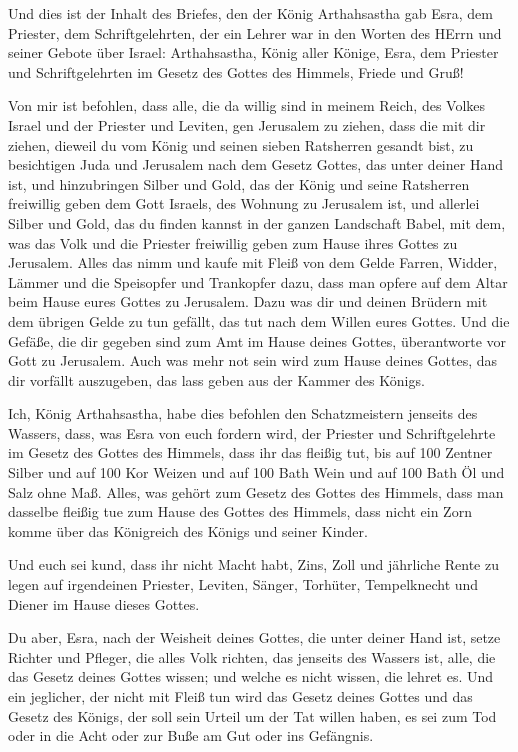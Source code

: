  Und dies ist der Inhalt des Briefes, den der König
Arthahsastha gab Esra, dem Priester, dem Schriftgelehrten, der ein
Lehrer war in den Worten des HErrn und seiner Gebote über Israel:
 Arthahsastha, König aller Könige, Esra, dem Priester und
Schriftgelehrten im Gesetz des Gottes des Himmels, Friede und Gruß!

 Von mir ist befohlen, dass alle, die da willig sind in
meinem Reich, des Volkes Israel und der Priester und Leviten, gen
Jerusalem zu ziehen, dass die mit dir ziehen,  dieweil du
vom König und seinen sieben Ratsherren gesandt bist, zu besichtigen Juda
und Jerusalem nach dem Gesetz Gottes, das unter deiner Hand ist,
 und hinzubringen Silber und Gold, das der König und
seine Ratsherren freiwillig geben dem Gott Israels, des Wohnung zu
Jerusalem ist,  und allerlei Silber und Gold, das du
finden kannst in der ganzen Landschaft Babel, mit dem, was das Volk und
die Priester freiwillig geben zum Hause ihres Gottes zu Jerusalem.
 Alles das nimm und kaufe mit Fleiß von dem Gelde Farren,
Widder, Lämmer und die Speisopfer und Trankopfer dazu, dass man opfere
auf dem Altar beim Hause eures Gottes zu Jerusalem.  Dazu
was dir und deinen Brüdern mit dem übrigen Gelde zu tun gefällt, das tut
nach dem Willen eures Gottes.  Und die Gefäße, die dir
gegeben sind zum Amt im Hause deines Gottes, überantworte vor Gott zu
Jerusalem.  Auch was mehr not sein wird zum Hause deines
Gottes, das dir vorfällt auszugeben, das lass geben aus der Kammer des
Königs.

 Ich, König Arthahsastha, habe dies befohlen den
Schatzmeistern jenseits des Wassers, dass, was Esra von euch fordern
wird, der Priester und Schriftgelehrte im Gesetz des Gottes des Himmels,
dass ihr das fleißig tut,  bis auf 100 Zentner Silber und
auf 100 Kor Weizen und auf 100 Bath Wein und auf 100 Bath Öl und Salz
ohne Maß.  Alles, was gehört zum Gesetz des Gottes des
Himmels, dass man dasselbe fleißig tue zum Hause des Gottes des Himmels,
dass nicht ein Zorn komme über das Königreich des Königs und seiner
Kinder.

 Und euch sei kund, dass ihr nicht Macht habt, Zins, Zoll
und jährliche Rente zu legen auf irgendeinen Priester, Leviten, Sänger,
Torhüter, Tempelknecht und Diener im Hause dieses Gottes.

 Du aber, Esra, nach der Weisheit deines Gottes, die
unter deiner Hand ist, setze Richter und Pfleger, die alles Volk
richten, das jenseits des Wassers ist, alle, die das Gesetz deines
Gottes wissen; und welche es nicht wissen, die lehret es.
 Und ein jeglicher, der nicht mit Fleiß tun wird das
Gesetz deines Gottes und das Gesetz des Königs, der soll sein Urteil um
der Tat willen haben, es sei zum Tod oder in die Acht oder zur Buße am
Gut oder ins Gefängnis.

